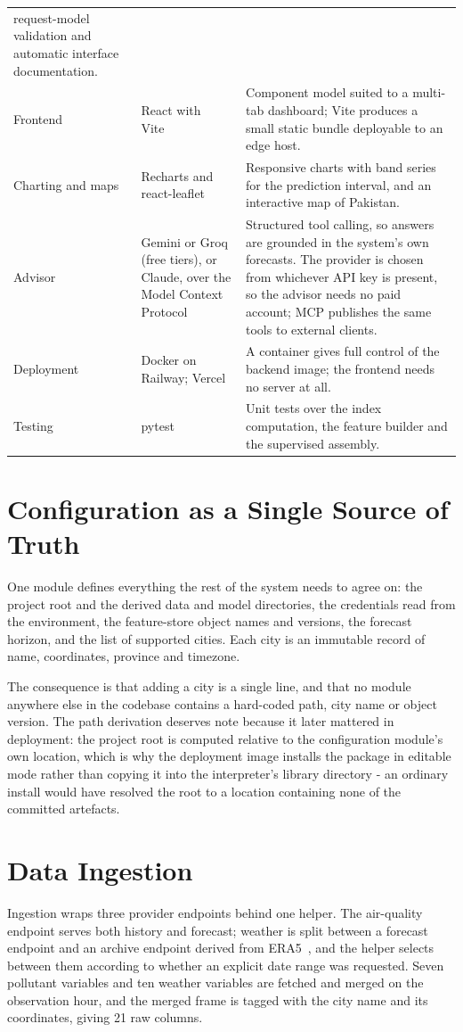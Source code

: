 \begin{xltabular}{\textwidth}{P{2.6cm} P{3.1cm} Y}
request-model validation and automatic interface documentation. \\
Frontend & React with Vite~\cite{ref:react,ref:vite} & Component model suited to
a multi-tab dashboard; Vite produces a small static bundle deployable to an edge
host. \\
Charting and maps & Recharts and react-leaflet~\cite{ref:leaflet} & Responsive
charts with band series for the prediction interval, and an interactive map of
Pakistan. \\
Advisor & Gemini or Groq (free tiers), or Claude, over the Model Context
Protocol~\cite{ref:mcp} & Structured tool calling, so answers are grounded in the
system's own forecasts. The provider is chosen from whichever API key is present,
so the advisor needs no paid account; MCP publishes the same tools to external
clients. \\
Deployment & Docker on Railway; Vercel~\cite{ref:docker} & A container gives full
control of the backend image; the frontend needs no server at all. \\
Testing & pytest~\cite{ref:pytest} & Unit tests over the index computation, the
feature builder and the supervised assembly. \\
\end{xltabular}

\section{Configuration as a Single Source of Truth}
One module defines everything the rest of the system needs to agree on: the
project root and the derived data and model directories, the credentials read
from the environment, the feature-store object names and versions, the forecast
horizon, and the list of supported cities. Each city is an immutable record of
name, coordinates, province and timezone.

The consequence is that adding a city is a single line, and that no module
anywhere else in the codebase contains a hard-coded path, city name or object
version. The path derivation deserves note because it later mattered in
deployment: the project root is computed relative to the configuration module's
own location, which is why the deployment image installs the package in editable
mode rather than copying it into the interpreter's library directory - an
ordinary install would have resolved the root to a location containing none of
the committed artefacts.

\section{Data Ingestion}
Ingestion wraps three provider endpoints behind one helper. The air-quality
endpoint serves both history and forecast; weather is split between a forecast
endpoint and an archive endpoint derived from ERA5~\cite{ref:era5}, and the
helper selects between them according to whether an explicit date range was
requested. Seven pollutant variables and ten weather variables are fetched and
merged on the observation hour, and the merged frame is tagged with the city name
and its coordinates, giving 21 raw columns.

